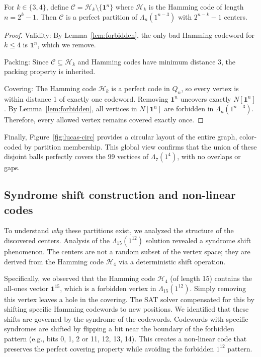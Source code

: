 \begin{theorem}[By-construction for $n = 2^k - 1$, $s = n-3$, $k \in \{3,4\}$]\label{thm:construction}
For $k \in \{3, 4\}$, define $\mathcal{C} = \mathcal{H}_k \setminus \{\mathbf{1}^n\}$ where $\mathcal{H}_k$ is the Hamming code of length $n = 2^k - 1$. Then $\mathcal{C}$ is a perfect partition of $\Lambda_n(1^{n-3})$ with $2^{n-k} - 1$ centers.
\end{theorem}

\begin{proof}
Validity: By Lemma~\ref{lem:forbidden}, the only bad Hamming codeword for $k \leq 4$ is $\mathbf{1}^n$, which we remove.

Packing: Since $\mathcal{C} \subseteq \mathcal{H}_k$ and Hamming codes have minimum distance 3, the packing property is inherited.

Covering: The Hamming code $\mathcal{H}_k$ is a perfect code in $Q_n$, so every vertex is within distance 1 of exactly one codeword. Removing $\mathbf{1}^n$ uncovers exactly $N[\mathbf{1}^n]$. By Lemma~\ref{lem:forbidden}, all vertices in $N[\mathbf{1}^n]$ are forbidden in $\Lambda_n(1^{n-3})$. Therefore, every allowed vertex remains covered exactly once.
\end{proof}

Finally, Figure~\ref{fig:lucas-circ} provides a circular layout of the entire graph, color-coded by partition membership. This global view confirms that the union of these disjoint balls perfectly covers the 99 vertices of $\Lambda_7(1^4)$, with no overlaps or gaps.



\subsection{Syndrome shift construction and non-linear codes}
To understand \textit{why} these partitions exist, we analyzed the structure of the discovered centers. Analysis of the $\Lambda_{15}(1^{12})$ solution revealed a syndrome shift phenomenon. The centers are not a random subset of the vertex space; they are derived from the Hamming code $\mathcal{H}_4$ via a deterministic shift operation.

Specifically, we observed that the Hamming code $\mathcal{H}_4$ (of length 15) contains the all-ones vector $\mathbf{1}^{15}$, which is a forbidden vertex in $\Lambda_{15}(1^{12})$. Simply removing this vertex leaves a hole in the covering. The SAT solver compensated for this by shifting specific Hamming codewords to new positions. We identified that these shifts are governed by the syndrome of the codewords. Codewords with specific syndromes are shifted by flipping a bit near the boundary of the forbidden pattern (e.g., bits 0, 1, 2 or 11, 12, 13, 14). This creates a non-linear code that preserves the perfect covering property while avoiding the forbidden $1^{12}$ pattern.

